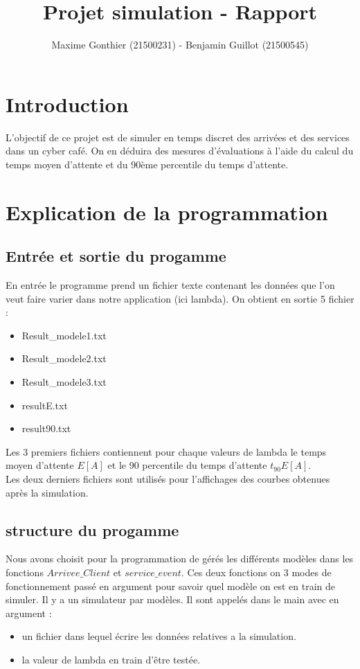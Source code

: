 \documentclass[a4paper,11pt]{article}
\title{Projet simulation - Rapport}
\author{Maxime Gonthier (21500231) - Benjamin Guillot (21500545)}
\begin{document}
\clearpage
\maketitle

\newpage
\tableofcontents

\newpage
\section{Introduction}
	L'objectif de ce projet est de simuler en temps discret des arrivées et des services dans un cyber café. On en déduira des mesures d'évaluations à l'aide du calcul du temps moyen d'attente et du 90ème percentile du temps d'attente. 
\newpage
\section{Explication de la programmation}
	\subsection{Entrée et sortie du progamme}
	En entrée le programme prend un fichier texte contenant les données que l'on veut faire varier dans notre application (ici lambda).
	On obtient en sortie 5 fichier :
	\begin{itemize}
		\item Result\_modele1.txt
		\item Result\_modele2.txt
		\item Result\_modele3.txt
		\item resultE.txt
		\item result90.txt
	\end{itemize}
	Les 3 premiers fichiers contiennent pour chaque valeurs de lambda le temps moyen d'attente $E[A]$ et le 90 percentile du temps d'attente $t_{90}E[A]$.\\
	Les deux derniers fichiers sont utilisés pour l'affichages des courbes obtenues après la simulation.
	\subsection{structure du progamme}
	Nous avons choisit pour la programmation de gérés les différents modèles dans les fonctions $Arrivee\_Client$ et $service\_event$. Ces deux fonctions on 3 modes de fonctionnement
	passé en argument pour savoir quel modèle on est en train de simuler. Il y a un simulateur par modèles.
	Il sont appelés dans le main avec en argument :
	\begin{itemize}
		\item un fichier dans lequel écrire les données relatives a la simulation.
		\item la valeur de lambda en train d'être testée.
	\end{itemize}
\end{document}
